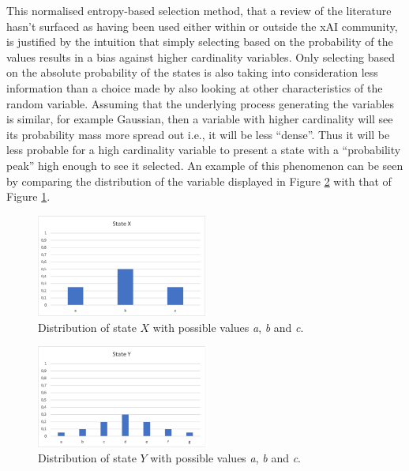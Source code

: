 This normalised entropy-based selection method, that a review of the literature hasn't surfaced as having been used either within or outside the xAI community, is justified by the intuition that simply selecting based on the probability of the values results in a bias against higher cardinality variables.
Only selecting based on the absolute probability of the states is also taking into consideration less information than a choice made by also looking at other characteristics of the random variable.  
Assuming that the underlying process generating the variables is similar, for example Gaussian, then a variable with higher cardinality will see its probability mass more spread out i.e., it will be less \enquote{dense}.
Thus it will be less probable for a high cardinality variable to present a state with a \enquote{probability peak} high enough to see it selected.
An example of this phenomenon can be seen by comparing the distribution of the variable displayed in Figure \ref{fig:entropy-example-2} with that of Figure \ref{fig:entropy-example-1}.

\begin{figure}[htbp]
\centerline{\includegraphics[width=0.5\textwidth]{methodology/images/entropy-example-1}}
\caption{Distribution of state $X$ with possible values \textit{a}, \textit{b} and \textit{c}.}
\label{fig:entropy-example-1}
\end{figure}

\begin{figure}[htbp]
\centerline{\includegraphics[width=0.5\textwidth]{methodology/images/entropy-example-2}}
\caption{Distribution of state $Y$ with possible values \textit{a}, \textit{b} and \textit{c}.}
\label{fig:entropy-example-2}
\end{figure}

